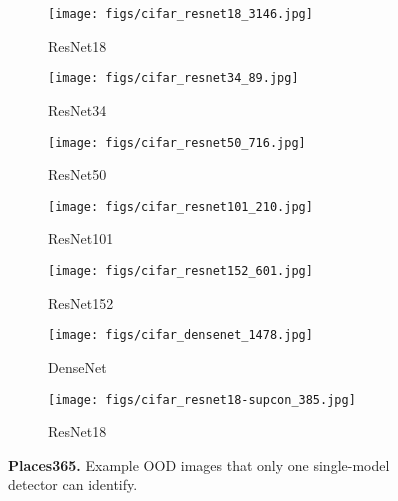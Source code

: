 \documentclass{article} \usepackage{iclr2023_conference,times}
\begin{document}
\begin{figure}[t!]
  \centering
  \begin{subfigure}[b]{0.24\linewidth}
     \texttt{[image: figs/cifar\_resnet18\_3146.jpg]}
     \caption{ResNet18}
  \end{subfigure}
  \begin{subfigure}[b]{0.24\linewidth}
    \texttt{[image: figs/cifar\_resnet34\_89.jpg]}
    \caption{ResNet34}
  \end{subfigure}
  \begin{subfigure}[b]{0.24\linewidth}
    \texttt{[image: figs/cifar\_resnet50\_716.jpg]}
    \caption{ResNet50}
  \end{subfigure}
    \begin{subfigure}[b]{0.24\linewidth}
    \texttt{[image: figs/cifar\_resnet101\_210.jpg]}
    \caption{ResNet101}
  \end{subfigure}
  \begin{subfigure}[b]{0.24\linewidth}
    \texttt{[image: figs/cifar\_resnet152\_601.jpg]}
    \caption{ResNet152}
  \end{subfigure}
    \begin{subfigure}[b]{0.24\linewidth}
    \texttt{[image: figs/cifar\_densenet\_1478.jpg]}
    \caption{DenseNet}
  \end{subfigure}
    \begin{subfigure}[b]{0.24\linewidth}
    \texttt{[image: figs/cifar\_resnet18-supcon\_385.jpg]}
    \caption{ResNet18}
  \end{subfigure}
  \caption{{\bf Places365.} Example OOD images that only one single-model detector can identify.}
  \label{fig1}
\end{figure}
\end{document}
